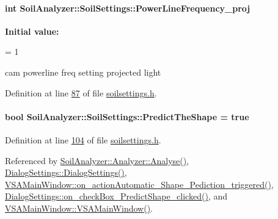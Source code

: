 \paragraph[{Power\+Line\+Frequency\+\_\+proj}]{\setlength{\rightskip}{0pt plus 5cm}int Soil\+Analyzer\+::\+Soil\+Settings\+::\+Power\+Line\+Frequency\+\_\+proj}\label{class_soil_analyzer_1_1_soil_settings_a08370685977bf9a200a13da5008f743f}
{\bfseries Initial value\+:}
\begin{DoxyCode}
=
      1
\end{DoxyCode}
cam powerline freq setting projected light 

Definition at line \hyperlink{soilsettings_8h_source_l00087}{87} of file \hyperlink{soilsettings_8h_source}{soilsettings.\+h}.

\hypertarget{class_soil_analyzer_1_1_soil_settings_a369593522ac29f7dfa48fd6ca2afebef}{}
\paragraph[{Predict\+The\+Shape}]{\setlength{\rightskip}{0pt plus 5cm}bool Soil\+Analyzer\+::\+Soil\+Settings\+::\+Predict\+The\+Shape = true}\label{class_soil_analyzer_1_1_soil_settings_a369593522ac29f7dfa48fd6ca2afebef}


Definition at line \hyperlink{soilsettings_8h_source_l00104}{104} of file \hyperlink{soilsettings_8h_source}{soilsettings.\+h}.



Referenced by \hyperlink{analyzer_8cpp_source_l00065}{Soil\+Analyzer\+::\+Analyzer\+::\+Analyse()}, \hyperlink{dialogsettings_8cpp_source_l00005}{Dialog\+Settings\+::\+Dialog\+Settings()}, \hyperlink{vsamainwindow_8cpp_source_l00541}{V\+S\+A\+Main\+Window\+::on\+\_\+action\+Automatic\+\_\+\+Shape\+\_\+\+Pediction\+\_\+triggered()}, \hyperlink{dialogsettings_8cpp_source_l00515}{Dialog\+Settings\+::on\+\_\+check\+Box\+\_\+\+Predict\+Shape\+\_\+clicked()}, and \hyperlink{vsamainwindow_8cpp_source_l00004}{V\+S\+A\+Main\+Window\+::\+V\+S\+A\+Main\+Window()}.

\hypertarget{class_soil_analyzer_1_1_soil_settings_a72cdc805222bbb57772cb3d9bba7555a}{}

